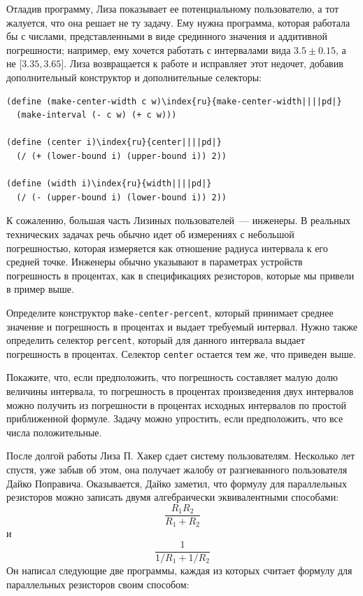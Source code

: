 \par\medskip
Отладив программу, Лиза показывает ее потенциальному
пользователю, а тот жалуется, что она решает не ту задачу.  Ему нужна
программа, которая работала бы с числами, представленными в виде
срединного значения и аддитивной погрешности; например, ему хочется
работать с интервалами вида $3.5 \pm 0.15$, а не
$\lbrack 3.35, 3.65 \rbrack$.  Лиза возвращается к работе и исправляет
этот недочет, добавив дополнительный конструктор и дополнительные
селекторы:

\begin{Verbatim}[fontsize=\small]
(define (make-center-width c w)\index{ru}{make-center-width||||pd|}
  (make-interval (- c w) (+ c w)))

(define (center i)\index{ru}{center||||pd|}
  (/ (+ (lower-bound i) (upper-bound i)) 2))

(define (width i)\index{ru}{width||||pd|}
  (/ (- (upper-bound i) (lower-bound i)) 2))
\end{Verbatim}
К сожалению, большая часть Лизиных пользователей~--- инженеры.
В реальных технических задачах речь обычно идет об измерениях с
небольшой погрешностью, которая измеряется как отношение радиуса
интервала к его средней точке.  Инженеры обычно указывают в параметрах 
устройств погрешность в процентах, как в спецификациях резисторов,
которые мы привели в пример выше.
\begin{exercise}{2.12}\label{EX2.12}%
Определите конструктор {\tt make-center-percent},
который принимает среднее значение и погрешность в процентах и выдает
требуемый интервал.  Нужно также определить селектор
{\tt percent}, который для данного интервала выдает погрешность 
в процентах.  Селектор {\tt center} остается тем же, что
приведен выше.
\end{exercise}
\begin{exercise}{2.13}\label{EX2.13}%
Покажите, что, если предположить, что погрешность
составляет малую долю величины интервала, то погрешность в процентах
произведения двух интервалов можно получить из погрешности  в
процентах исходных интервалов по простой приближенной формуле.  Задачу 
можно упростить, если предположить, что все числа положительные.
\end{exercise}

\medskip

После долгой работы Лиза П. Хакер сдает систему
пользователям.  Не\-с\-колько лет спустя, уже%
забыв об этом, она получает жалобу от разгневанного пользователя
Дайко Поправича.  Оказывается, Дайко заметил, что формулу для
параллельных резисторов можно записать двумя алгебраически
эквивалентными способами:
$$
\frac{R_1 R_2}
     {R_1 + R_2}
$$
и
$$
\frac{1}
     {1 / R_1 + 1 / R_2}
$$
Он написал следующие две программы, каждая из которых считает формулу
для параллельных резисторов своим способом:

